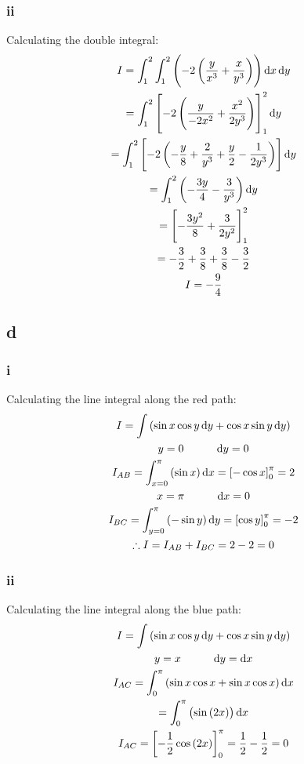 \documentclass[11pt]{article}
\numberwithin{equation}{section}
\begin{document}
\subsubsection{ii}
Calculating the double integral:
\begin{gather}
    I = \int_{1}^{2} \int_{1}^{2} \left(-2\left(\frac{y}{x^3}+\frac{x}{y^3}\right)\right) \dif x \dif y\\
    = \int_{1}^{2} \left[-2\left(\frac{y}{-2x^2} + \frac{x^2}{2y^3}\right)\right]_1^2 \dif y\\
    = \int_{1}^{2} \left[-2\left(-\frac{y}{8} + \frac{2}{y^3}+\frac{y}{2} - \frac{1}{2y^3}\right)\right] \dif y\\
    = \int_{1}^{2} \left(-\frac{3y}{4}-\frac{3}{y^3}\right) \dif y\\
    = \left[-\frac{3y^2}{8}+\frac{3}{2y^2}\right]_1^2\\
    = -\frac{3}{2} + \frac{3}{8} + \frac{3}{8} - \frac{3}{2}\\
    I = -\frac{9}{4}
\end{gather}
\subsection{d}
\subsubsection{i}
Calculating the line integral along the red path:
\begin{gather}
    I = \int \left(\sin x \cos y \dif y + \cos x \sin y \dif y\right)\\
    y = 0 \hspace{1cm} \dif y = 0\\
    I_{AB} = \int_{x=0}^{\pi} \left(\sin x\right)\dif x = \left[-\cos x\right]_0^{\pi} = 2\\
    x = \pi \hspace{1cm} \dif x = 0\\
    I_{BC} = \int_{y=0}^{\pi} \left(-\sin y\right)\dif y= \left[\cos y\right]_0^{\pi} = -2\\
    \therefore I = I_{AB} + I_{BC} = 2-2 = 0
\end{gather}
\subsubsection{ii}
Calculating the line integral along the blue path:
\begin{gather}
    I = \int \left(\sin x \cos y \dif y + \cos x \sin y \dif y\right)\\
    y = x \hspace{1cm} \dif y = \dif x\\
    I_{AC} = \int_0^{\pi} \left(\sin x \cos x + \sin x \cos x\right) \dif x\\
    = \int_0^{\pi} \left(\sin \left(2x\right)\right)\dif x\\
    I_{AC} = \left[-\frac{1}{2}\cos \left(2x\right)\right]_0^{\pi} = \frac{1}{2} - \frac{1}{2} = 0\\
\end{gather}
\end{document}
